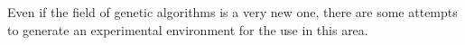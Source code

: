 Even if the field of genetic algorithms is a very new one, there are some attempts
to generate an experimental environment for the use in this area.
